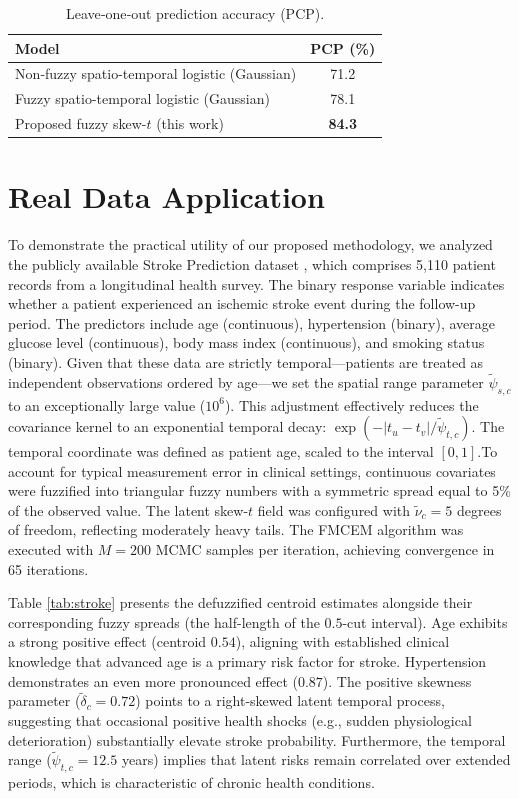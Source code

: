 \documentclass[twoside]{article}
\begin{document}
\begin{table}[!ht]
\centering
\caption{Leave‑one‑out prediction accuracy (PCP).}\label{tab:pred}
\begin{tabular}{lc}
\hline
Model & PCP (\%) \\ \hline
Non‑fuzzy spatio-temporal logistic (Gaussian) & 71.2 \\
Fuzzy spatio-temporal logistic (Gaussian)     & 78.1 \\
Proposed fuzzy skew-\(t\) (this work)          & \textbf{84.3} \\ \hline
\end{tabular}
\end{table}

\section{Real Data Application}

To demonstrate the practical utility of our proposed methodology, we analyzed the publicly available Stroke Prediction dataset \citep{StrokeData2023}, which comprises 5,110 patient records from a longitudinal health survey. The binary response variable indicates whether a patient experienced an ischemic stroke event during the follow-up period. The predictors include age (continuous), hypertension (binary), average glucose level (continuous), body mass index (continuous), and smoking status (binary). Given that these data are strictly temporal—patients are treated as independent observations ordered by age—we set the spatial range parameter $\tilde{\psi}_{s,c}$ to an exceptionally large value ($10^6$). This adjustment effectively reduces the covariance kernel to an exponential temporal decay: $\exp(-|t_u-t_v|/\tilde{\psi}_{t,c})$. The temporal coordinate was defined as patient age, scaled to the interval $[0,1]$.To account for typical measurement error in clinical settings, continuous covariates were fuzzified into triangular fuzzy numbers with a symmetric spread equal to 5\% of the observed value. The latent skew-$t$ field was configured with $\tilde{\nu}_c=5$ degrees of freedom, reflecting moderately heavy tails. The FMCEM algorithm was executed with $M=200$ MCMC samples per iteration, achieving convergence in 65 iterations.

Table \ref{tab:stroke} presents the defuzzified centroid estimates alongside their corresponding fuzzy spreads (the half-length of the $0.5$-cut interval). Age exhibits a strong positive effect (centroid $0.54$), aligning with established clinical knowledge that advanced age is a primary risk factor for stroke. Hypertension demonstrates an even more pronounced effect ($0.87$). The positive skewness parameter ($\tilde{\delta}_c=0.72$) points to a right-skewed latent temporal process, suggesting that occasional positive health shocks (e.g., sudden physiological deterioration) substantially elevate stroke probability. Furthermore, the temporal range ($\tilde{\psi}_{t,c}=12.5$ years) implies that latent risks remain correlated over extended periods, which is characteristic of chronic health conditions.
\end{document}
